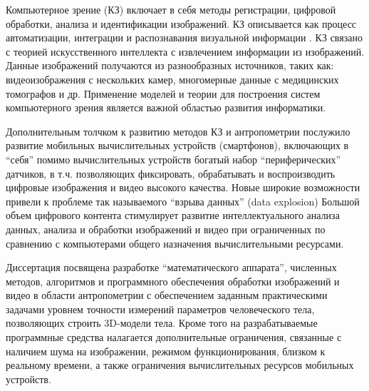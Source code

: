 Компьютерное зрение (КЗ) включает в себя методы регистрации, цифровой обработки, анализа и идентификации изображений. КЗ описывается как процесс автоматизации, интеграции и распознавания визуальной информации \cite{Wang2016,Maria2016,Ioan2011,Lauren2013,Saha2005,Azriel2001}. КЗ связано с теорией искусственного интеллекта с извлечением информации из изображений. Данные изображений получаются из разнообразных источников, таких как: видеоизображения с нескольких камер, многомерные данные с медицинских томографов и др. Применение моделей и теории для построения систем компьютерного зрения является важной областью развития информатики.

Дополнительным толчком к развитию методов КЗ и антропометрии послужило развитие мобильных вычислительных устройств (смартфонов), включающих в ``себя'' помимо вычислительных устройств  богатый набор ``периферических'' датчиков, в т.ч. позволяющих фиксировать, обрабатывать и воспроизводить цифровые изображения и видео высокого качества.  Новые широкие возможности привели к проблеме так называемого ``взрыва данных'' (data explosion)   Большой объем цифрового контента стимулирует развитие интеллектуального анализа данных, анализа и обработки изображений и видео при ограниченных по сравнению с компьютерами общего назначения вычислительными ресурсами.

Диссертация посвящена разработке ``математического аппарата'', численных методов, алгоритмов и программного обеспечения  обработки изображений и видео в области антропометрии с обеспечением заданным практическими задачами уровнем точности измерений параметров человеческого тела, позволяющих строить 3D-модели тела.  Кроме того на разрабатываемые программные средства налагается дополнительные ограничения, связанные с наличием шума на изображении, режимом функционирования, близком к реальному времени, а также ограничения вычислительных ресурсов мобильных устройств.


